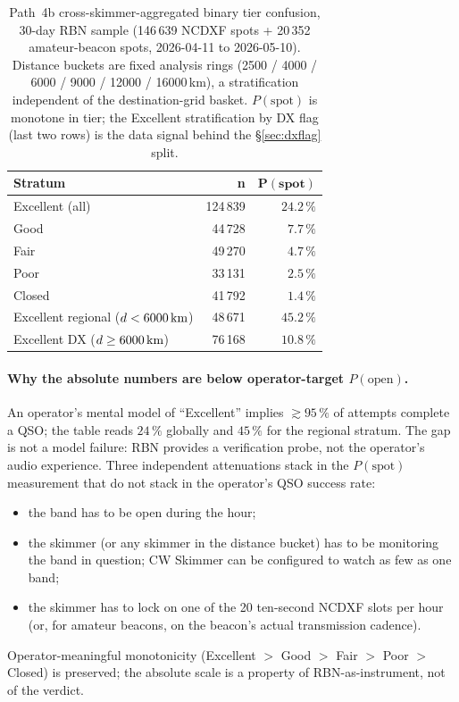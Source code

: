 \documentclass[11pt,a4paper]{article}
\newcommand{\SI}[2]{#1\,\text{#2}}
\newcommand{\km}{\text{km}}
\begin{document}
\begin{table}[H]
\centering
\caption{Path~4b cross-skimmer-aggregated binary tier confusion,
30-day RBN sample (146\,639 NCDXF spots + 20\,352 amateur-beacon
spots, 2026-04-11 to 2026-05-10).  Distance buckets are fixed
analysis rings (2500 / 4000 / 6000 / 9000 / 12000 /
16000\,km), a stratification independent of the
destination-grid basket.
$P(\text{spot})$ is monotone in tier; the Excellent stratification
by DX flag (last two rows) is the data signal behind the
\S\ref{sec:dxflag} split.}
\label{tab:rbnconfusion}
\begin{tabular}{@{}lrr@{}}
\toprule
\textbf{Stratum} & \textbf{n} & $\boldsymbol{P(\text{spot})}$ \\
\midrule
Excellent (all)              & 124\,839 & $24.2\,\%$ \\
Good                         &  44\,728 & $\phantom{0}7.7\,\%$ \\
Fair                         &  49\,270 & $\phantom{0}4.7\,\%$ \\
Poor                         &  33\,131 & $\phantom{0}2.5\,\%$ \\
Closed                       &  41\,792 & $\phantom{0}1.4\,\%$ \\
\midrule
Excellent regional ($d < \SI{6000}{\km}$) & 48\,671 & $45.2\,\%$ \\
Excellent DX ($d \geq \SI{6000}{\km}$)    & 76\,168 & $10.8\,\%$ \\
\bottomrule
\end{tabular}
\end{table}

\paragraph{Why the absolute numbers are below operator-target
$P(\text{open})$.}  An operator's mental model of ``Excellent''
implies $\gtrsim 95\,\%$ of attempts complete a QSO; the table
reads $24\,\%$ globally and $45\,\%$ for the regional stratum.
The gap is not a model failure: RBN provides a verification
probe, not the operator's audio experience.  Three independent
attenuations stack in the $P(\text{spot})$ measurement that do
not stack in the operator's QSO success rate:
\begin{itemize}[nosep]
  \item the band has to be open during the hour;
  \item the skimmer (or any skimmer in the distance bucket) has
        to be monitoring the band in question; CW Skimmer can
        be configured to watch as few as one band;
  \item the skimmer has to lock on one of the 20 ten-second
        NCDXF slots per hour (or, for amateur beacons, on the
        beacon's actual transmission cadence).
\end{itemize}
Operator-meaningful monotonicity (Excellent $>$ Good $>$ Fair
$>$ Poor $>$ Closed) is preserved; the absolute scale is a
property of RBN-as-instrument, not of the verdict.
\end{document}
